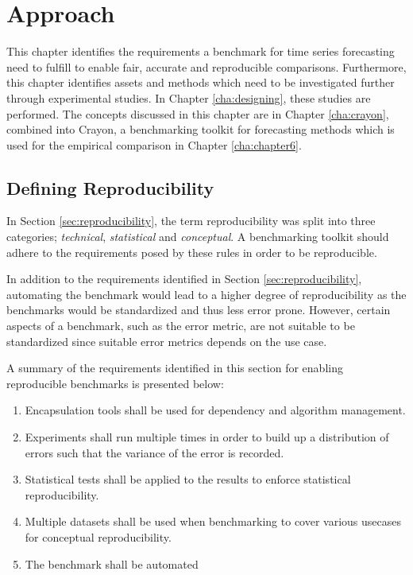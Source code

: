 \chapter{Approach}
\label{cha:approach}
This chapter identifies the requirements a benchmark for time series forecasting need to fulfill to enable fair, accurate and reproducible comparisons. Furthermore, this chapter identifies assets and methods which need to be investigated further through experimental studies. In Chapter \ref{cha:designing}, these studies are performed. The concepts discussed in this chapter are in Chapter \ref{cha:crayon}, combined into Crayon, a benchmarking toolkit for forecasting methods which is used for the empirical comparison in Chapter \ref{cha:chapter6}.

\section{Defining Reproducibility}
In Section \ref{sec:reproducibility}, the term reproducibility was split into three categories; \textit{technical}, \textit{statistical} and \textit{conceptual}. A benchmarking toolkit should adhere to the requirements posed by these rules in order to be reproducible.

In addition to the requirements identified in Section \ref{sec:reproducibility}, automating the benchmark would lead to a higher degree of reproducibility as the benchmarks would be standardized and thus less error prone. However, certain aspects of a benchmark, such as the error metric, are not suitable to be standardized since suitable error metrics depends on the use case.

A summary of the requirements identified in this section for enabling reproducible benchmarks is presented below:

\begin{enumerate}
  \item Encapsulation tools shall be used for dependency and algorithm management.
  \item Experiments shall run multiple times in order to build up a distribution of errors such that the variance of the error is recorded.
  \item Statistical tests shall be applied to the results to enforce statistical reproducibility.
  \item Multiple datasets shall be used when benchmarking to cover various usecases for conceptual reproducibility.
  \item The benchmark shall be automated
\end{enumerate}



